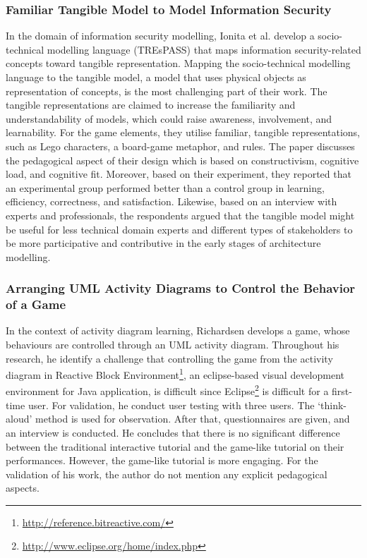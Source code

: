 \documentclass[12pt, a4paper]{report}
\begin{document}
{\subsubsection{Familiar Tangible Model to Model Information Security}
In the domain of information security modelling, Ionita et al.\cite{Ionita2015} develop a socio-technical modelling language (TREsPASS) that maps information security-related concepts toward tangible representation. Mapping the socio-technical modelling language to the tangible model, a model that uses physical objects as representation of concepts, is the most challenging part of their work. The tangible representations are claimed to increase the familiarity and understandability of models, which could raise awareness, involvement, and learnability. For the game elements, they utilise familiar, tangible representations, such as Lego characters, a board-game metaphor, and rules. The paper discusses the pedagogical aspect of their design which is based on constructivism, cognitive load, and cognitive fit. Moreover, based on their experiment, they reported that an experimental group performed better than a control group in learning, efficiency, correctness, and satisfaction. Likewise, based on an interview with experts and professionals, the respondents argued that the tangible model might be useful for less technical domain experts and different types of stakeholders to be more participative and contributive in the early stages of architecture modelling.

\subsubsection{Arranging UML Activity Diagrams to Control the Behavior of a Game}
In the context of activity diagram learning, Richardsen \cite{Richardsen2014} develops a game, whose behaviours are controlled through an UML activity diagram. Throughout his research, he identify a challenge that controlling the game from the activity diagram in Reactive Block Environment\footnote{\url{http://reference.bitreactive.com/}}, an eclipse-based visual development environment for Java application, is difficult since Eclipse\footnote{\url{http://www.eclipse.org/home/index.php}} is difficult for a first-time user. For validation, he conduct user testing with three users. The `think-aloud' method is used for observation. After that, questionnaires are given, and an interview is conducted. He concludes that there is no significant difference between the traditional interactive tutorial and the game-like tutorial on their performances. However, the game-like tutorial is more engaging. For the validation of his work, the author do not mention any explicit pedagogical aspects.\\

}
\end{document}
